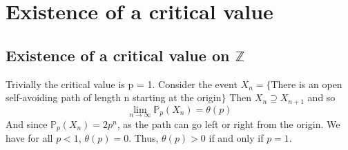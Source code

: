 \documentclass[a4paper,11pt]{article}
\newtheorem{theorem}{Theorem}[section]
\newtheorem{lemma}[theorem]{Lemma}
\theoremstyle{definition}
\newtheorem{definition}[theorem]{Definition}
\newcommand{\ints}{\mathbb{Z}}
\newcommand{\prob}{\mathbb{P}_p}
\begin{document}





\section{Existence of a critical value}
\subsection {Existence of a critical value on $\ints$}\label{critvalforZ}
Trivially the critical value is p = 1. Consider the event $X_n = \{$There is an open self-avoiding path of length n starting at the origin$\}$ 
Then $X_n \supseteq X_{n+1}$ and so 
$$\lim_{n\rightarrow \infty} \prob (X_n) = \theta(p)$$
And since $\prob (X_n) = 2p^n$, as the path can go left or right from the origin. We have for all $p <1$, $\theta(p) = 0$. Thus, $\theta(p) > 0$ if and only if $p = 1$. 
\end{document}
